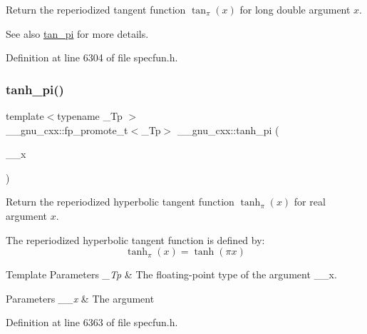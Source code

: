 Return the reperiodized tangent function $ \tan_\pi(x) $ for {\ttfamily long double} argument $ x $.

\begin{DoxySeeAlso}{See also}
\hyperlink{group__gnu__math__spec__func_ga12855bd62fe6a955ef0d1d5e92c85ba9}{tan\+\_\+pi} for more details. 
\end{DoxySeeAlso}


Definition at line 6304 of file specfun.\+h.

\mbox{\label{group__gnu__math__spec__func_ga8729ffd5acf3266315e9dac1b5a9b3a6}} 
\subsubsection{\texorpdfstring{tanh\+\_\+pi()}{tanh\_pi()}}
{\footnotesize\ttfamily template$<$typename \+\_\+\+Tp $>$ \\
\+\_\+\+\_\+gnu\+\_\+cxx\+::fp\+\_\+promote\+\_\+t$<$\+\_\+\+Tp$>$ \+\_\+\+\_\+gnu\+\_\+cxx\+::tanh\+\_\+pi (\begin{DoxyParamCaption}\item[{\+\_\+\+Tp}]{\+\_\+\+\_\+x }\end{DoxyParamCaption})\hspace{0.3cm}{\ttfamily [inline]}}

Return the reperiodized hyperbolic tangent function $ \tanh_\pi(x) $ for real argument $ x $.

The reperiodized hyperbolic tangent function is defined by\+: \[ \tanh_\pi(x) = \tanh(\pi x) \]


\begin{DoxyTemplParams}{Template Parameters}
{\em \+\_\+\+Tp} & The floating-\/point type of the argument {\ttfamily \+\_\+\+\_\+x}. \\
\hline
\end{DoxyTemplParams}

\begin{DoxyParams}{Parameters}
{\em \+\_\+\+\_\+x} & The argument \\
\hline
\end{DoxyParams}


Definition at line 6363 of file specfun.\+h.

